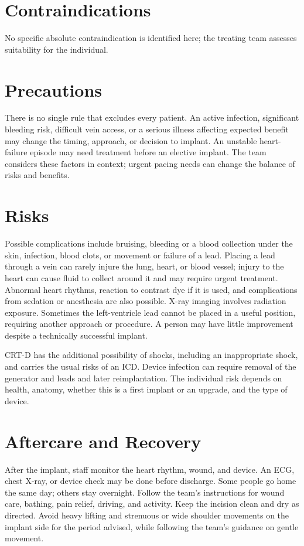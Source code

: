 \section*{Contraindications}
No specific absolute contraindication is identified here; the treating team assesses suitability for the individual.

\section*{Precautions}
There is no single rule that excludes every patient. An active infection, significant bleeding risk, difficult vein access, or a serious illness affecting expected benefit may change the timing, approach, or decision to implant. An unstable heart-failure episode may need treatment before an elective implant. The team considers these factors in context; urgent pacing needs can change the balance of risks and benefits.

\section*{Risks}
Possible complications include bruising, bleeding or a blood collection under the skin, infection, blood clots, or movement or failure of a lead. Placing a lead through a vein can rarely injure the lung, heart, or blood vessel; injury to the heart can cause fluid to collect around it and may require urgent treatment. Abnormal heart rhythms, reaction to contrast dye if it is used, and complications from sedation or anesthesia are also possible. X-ray imaging involves radiation exposure. Sometimes the left-ventricle lead cannot be placed in a useful position, requiring another approach or procedure. A person may have little improvement despite a technically successful implant.

CRT-D has the additional possibility of shocks, including an inappropriate shock, and carries the usual risks of an ICD. Device infection can require removal of the generator and leads and later reimplantation. The individual risk depends on health, anatomy, whether this is a first implant or an upgrade, and the type of device.

\section*{Aftercare and Recovery}
After the implant, staff monitor the heart rhythm, wound, and device. An ECG, chest X-ray, or device check may be done before discharge. Some people go home the same day; others stay overnight. Follow the team's instructions for wound care, bathing, pain relief, driving, and activity. Keep the incision clean and dry as directed. Avoid heavy lifting and strenuous or wide shoulder movements on the implant side for the period advised, while following the team's guidance on gentle movement.

